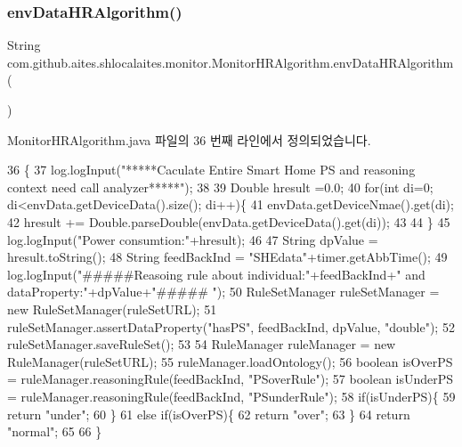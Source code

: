 \subsubsection{\texorpdfstring{env\+Data\+H\+R\+Algorithm()}{envDataHRAlgorithm()}}
{\footnotesize\ttfamily String com.\+github.\+aites.\+shlocalaites.\+monitor.\+Monitor\+H\+R\+Algorithm.\+env\+Data\+H\+R\+Algorithm (\begin{DoxyParamCaption}{ }\end{DoxyParamCaption})}



Monitor\+H\+R\+Algorithm.\+java 파일의 36 번째 라인에서 정의되었습니다.


\begin{DoxyCode}
36                                       \{
37         log.logInput(\textcolor{stringliteral}{"*****Caculate Entire Smart Home PS and reasoning context need call analyzer*****"});
38     
39         Double hresult =0.0;
40         \textcolor{keywordflow}{for}(\textcolor{keywordtype}{int} di=0; di<envData.getDeviceData().size(); di++)\{
41             envData.getDeviceNmae().get(di);
42             hresult += Double.parseDouble(envData.getDeviceData().get(di));
43             
44         \}
45         log.logInput(\textcolor{stringliteral}{"Power consumtion:"}+hresult);
46         
47         String dpValue = hresult.toString();
48         String feedBackInd = \textcolor{stringliteral}{"SHEdata"}+timer.getAbbTime();
49         log.logInput(\textcolor{stringliteral}{"#####Reasoing rule about individual:"}+feedBackInd+\textcolor{stringliteral}{" and dataProperty:"}+dpValue+\textcolor{stringliteral}{"#####
      "});
50         RuleSetManager ruleSetManager = \textcolor{keyword}{new} RuleSetManager(ruleSetURL);
51         ruleSetManager.assertDataProperty(\textcolor{stringliteral}{"hasPS"}, feedBackInd, dpValue, \textcolor{stringliteral}{"double"});
52         ruleSetManager.saveRuleSet();
53         
54         RuleManager ruleManager = \textcolor{keyword}{new} RuleManager(ruleSetURL);
55         ruleManager.loadOntology(); 
56         \textcolor{keywordtype}{boolean} isOverPS = ruleManager.reasoningRule(feedBackInd, \textcolor{stringliteral}{"PSoverRule"});
57         \textcolor{keywordtype}{boolean} isUnderPS = ruleManager.reasoningRule(feedBackInd, \textcolor{stringliteral}{"PSunderRule"});
58         \textcolor{keywordflow}{if}(isUnderPS)\{
59             \textcolor{keywordflow}{return} \textcolor{stringliteral}{"under"};
60         \}
61         \textcolor{keywordflow}{else} \textcolor{keywordflow}{if}(isOverPS)\{
62             \textcolor{keywordflow}{return} \textcolor{stringliteral}{"over"};
63         \}
64         \textcolor{keywordflow}{return} \textcolor{stringliteral}{"normal"};
65         
66     \}
\end{DoxyCode}

